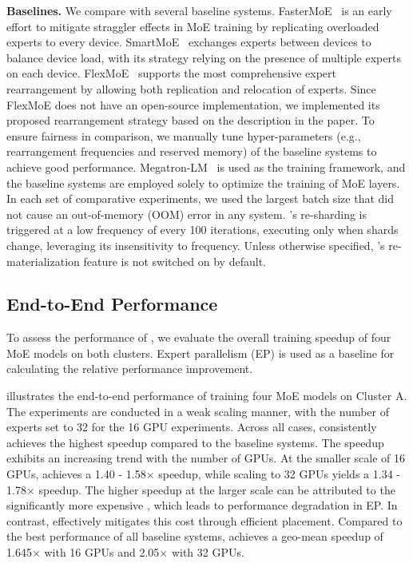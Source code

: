 


\textbf{Baselines.}
We compare \xxx with several baseline systems.
FasterMoE~\cite{he2022fastermoe} is an early effort to mitigate straggler effects in MoE training by replicating overloaded experts to every device.
SmartMoE~\cite{zhai2023smartmoe} exchanges experts between devices to balance device load, with its strategy relying on the presence of multiple experts on each device.
FlexMoE~\cite{nie2023flexmoe} supports the most comprehensive expert rearrangement by allowing both replication and relocation of experts.
Since FlexMoE does not have an open-source implementation, we implemented its proposed rearrangement strategy based on the description in the paper.
To ensure fairness in comparison, we manually tune hyper-parameters (e.g., rearrangement frequencies and reserved memory) of the baseline systems to achieve good performance.
Megatron-LM~\cite{shoeybi2019megatron} is used as the training framework, and the baseline systems are employed solely to optimize the training of MoE layers.
In each set of comparative experiments, we used the largest batch size that did not cause an out-of-memory (OOM) error in any system.
\xxx's re-sharding is triggered at a low frequency of every 100 iterations, executing only when shards change, leveraging its insensitivity to frequency.
Unless otherwise specified, \xxx's re-materialization feature is not switched on by default.


\subsection{End-to-End Performance}\label{sec:eval:end2end}

To assess the performance of \xxx, we evaluate the overall training speedup of four MoE models on both clusters.
Expert parallelism (EP) is used as a baseline for calculating the relative performance improvement.

 illustrates the end-to-end performance of training four MoE models on Cluster A.
The experiments are conducted in a weak scaling manner, with the number of experts set to 32 for the 16 GPU experiments.
Across all cases, \xxx consistently achieves the highest speedup compared to the baseline systems.
The speedup exhibits an increasing trend with the number of GPUs.
At the smaller scale of 16 GPUs, \xxx achieves a 1.40 - 1.58$\times$ speedup, while scaling to 32 GPUs yields a 1.34 - 1.78$\times$ speedup.
The higher speedup at the larger scale can be attributed to the significantly more expensive \collatoa, which leads to performance degradation in EP.
In contrast, \xxx effectively mitigates this cost through efficient placement.
Compared to the best performance of all baseline systems, \xxx achieves a geo-mean speedup of 1.645$\times$ with 16 GPUs and 2.05$\times$ with 32 GPUs.

